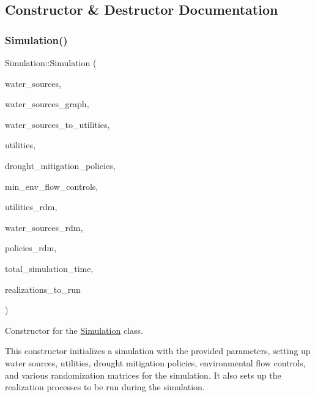 \subsection{Constructor \& Destructor Documentation}
\mbox{\label{classSimulation_ac9b9db9c3de5f9ff33f6ea89e2435c87}} 
\subsubsection{\texorpdfstring{Simulation()}{Simulation()}\hspace{0.1cm}{\footnotesize\ttfamily [1/3]}}
{\footnotesize\ttfamily Simulation\+::\+Simulation (\begin{DoxyParamCaption}\item[{vector$<$ \mbox{\hyperlink{classWaterSource}{Water\+Source}} $\ast$$>$ \&}]{water\+\_\+sources,  }\item[{Graph \&}]{water\+\_\+sources\+\_\+graph,  }\item[{const vector$<$ vector$<$ int $>$$>$ \&}]{water\+\_\+sources\+\_\+to\+\_\+utilities,  }\item[{vector$<$ \mbox{\hyperlink{classUtility}{Utility}} $\ast$$>$ \&}]{utilities,  }\item[{const vector$<$ Drought\+Mitigation\+Policy $\ast$$>$ \&}]{drought\+\_\+mitigation\+\_\+policies,  }\item[{vector$<$ Min\+Env\+Flow\+Control $\ast$$>$ \&}]{min\+\_\+env\+\_\+flow\+\_\+controls,  }\item[{vector$<$ vector$<$ double $>$$>$ \&}]{utilities\+\_\+rdm,  }\item[{vector$<$ vector$<$ double $>$$>$ \&}]{water\+\_\+sources\+\_\+rdm,  }\item[{vector$<$ vector$<$ double $>$$>$ \&}]{policies\+\_\+rdm,  }\item[{const unsigned long}]{total\+\_\+simulation\+\_\+time,  }\item[{vector$<$ unsigned long $>$ \&}]{realizations\+\_\+to\+\_\+run }\end{DoxyParamCaption})}



Constructor for the \mbox{\hyperlink{classSimulation}{Simulation}} class. 

This constructor initializes a simulation with the provided parameters, setting up water sources, utilities, drought mitigation policies, environmental flow controls, and various randomization matrices for the simulation. It also sets up the realization processes to be run during the simulation.


